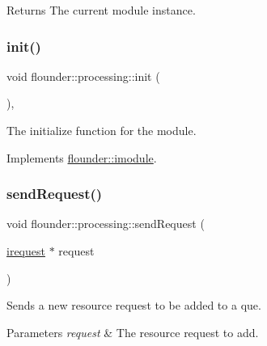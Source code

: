 \begin{DoxyReturn}{Returns}
The current module instance. 
\end{DoxyReturn}
\mbox{\label{classflounder_1_1processing_a5c9545d8a02d836bc198982750f24f49}} 
\subsubsection{\texorpdfstring{init()}{init()}}
{\footnotesize\ttfamily void flounder\+::processing\+::init (\begin{DoxyParamCaption}{ }\end{DoxyParamCaption})\hspace{0.3cm}{\ttfamily [override]}, {\ttfamily [virtual]}}



The initialize function for the module. 



Implements \hyperlink{classflounder_1_1imodule_a1725ef346952884d0741de61aba1e0c7}{flounder\+::imodule}.

\mbox{\label{classflounder_1_1processing_addb84aad44d50ae3fa9513cddcea9968}} 
\subsubsection{\texorpdfstring{send\+Request()}{sendRequest()}}
{\footnotesize\ttfamily void flounder\+::processing\+::send\+Request (\begin{DoxyParamCaption}\item[{\hyperlink{classflounder_1_1irequest}{irequest} $\ast$}]{request }\end{DoxyParamCaption})}



Sends a new resource request to be added to a que. 


\begin{DoxyParams}{Parameters}
{\em request} & The resource request to add. \\
\hline
\end{DoxyParams}
\mbox{\label{classflounder_1_1processing_ac096299eb1b5b67739586900710d4206}} 
